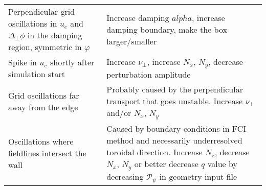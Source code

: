 \begin{longtable}{p{6cm}p{8cm}}
\qquad Perpendicular grid oscillations in $u_e$ and $\Delta_\perp \phi$ in the damping region, symmetric in $\varphi$
&
Increase damping $alpha$, increase damping boundary, make the box larger/smaller
    \\
\qquad Spike in $u_e$ shortly after simulation start
&
Increase $\nu_\perp$, increase $N_x$, $N_y$, decrease perturbation amplitude
    \\
\qquad Grid oscillations far away from the edge
&
Probably caused by the perpendicular transport that goes unstable. Increase $\nu_\perp$ and/or $N_x$, $N_y$
\\
\qquad Oscillations where fieldlines intersect the wall
&
Caused by boundary conditions in FCI method and necessarily underresolved toroidal direction. Increase $N_z$, decrease $N_x$, $N_y$ or better decrease $q$ value by decreasing $\mathcal P_\psi$ in geometry input file
\\
\bottomrule
\end{longtable}





